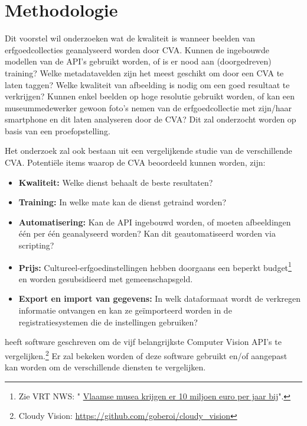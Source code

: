 \documentclass[fleqn,10pt]{voorstel}
\begin{document}
\section{Methodologie}
\label{sec:methodologie}

Dit voorstel wil onderzoeken wat de kwaliteit is wanneer beelden van erfgoedcollecties geanalyseerd worden door CVA. Kunnen de ingebouwde modellen van de API's gebruikt worden, of is er nood aan (doorgedreven) training? Welke metadatavelden zijn het meest geschikt om door een CVA te laten taggen? Welke kwaliteit van afbeelding is nodig om een goed resultaat te verkrijgen? Kunnen enkel beelden op hoge resolutie gebruikt worden, of kan een museummedewerker gewoon foto's nemen van de erfgoedcollectie met zijn/haar smartphone en dit laten analyseren door de CVA? Dit zal onderzocht worden op basis van een proefopstelling.

Het onderzoek zal ook bestaan uit een vergelijkende studie van de verschillende CVA. Potenti\"ele items waarop de CVA beoordeeld kunnen worden, zijn:
\begin{itemize}
	\item \textbf{Kwaliteit:} Welke dienst behaalt de beste resultaten?
	\item \textbf{Training:} In welke mate kan de dienst getraind worden?
	\item \textbf{Automatisering:} Kan de API ingebouwd worden, of moeten afbeeldingen \'{e}\'{e}n per \'{e}\'{e}n geanalyseerd worden? Kan dit geautomatiseerd worden via scripting?
	\item \textbf{Prijs:} Cultureel-erfgoedinstellingen hebben doorgaans een beperkt budget\footnote{Zie VRT NWS: " \href{https://www.vrt.be/vrtnws/nl/2018/09/28/vlaamse-musea-krijgen-er-10-miljoen-euro-per-jaar-bij/}{Vlaamse musea krijgen er 10 miljoen euro per jaar bij}".} en worden gesubsidieerd met gemeenschapsgeld.
	\item \textbf{Export en import van gegevens:} In welk dataformaat wordt de verkregen informatie ontvangen en kan ze geïmporteerd worden in de registratiesystemen die de instellingen gebruiken?
\end{itemize}
\textcite{Oberoi2016} heeft software geschreven om de vijf belangrijkste Computer Vision API's te vergelijken.\footnote{Cloudy Vision: \url{https://github.com/goberoi/cloudy_vision}} Er zal bekeken worden of deze software gebruikt en/of aangepast kan worden om de verschillende diensten te vergelijken.
\end{document}

